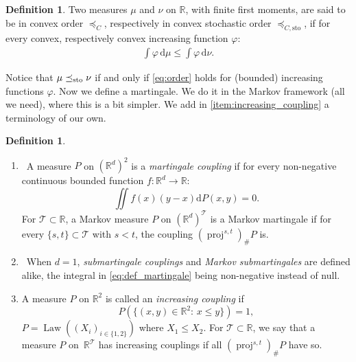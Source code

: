 \documentclass[JEP,XML,SOM,Unicode,NoEqCountersInSection,NoFloatCountersInSection,published]{cedram}
\theoremstyle{plain}
\theoremstyle{definition}
\newtheorem{defi}[them]{Definition}
\newcommand{\dd}{\mathrm{d}}
\newcommand{\Tt}{{\mathcal T}}
\newcommand{\R}{\mathbb{R}}
\newcommand{\law}{\operatorname{Law}}
\newcommand{\sto}{\mathrm{sto}}
\newcommand{\leqc}{\preceq_{C}}
\newcommand{\leqcs}{\preceq_{C,\sto}}
\newcommand{\leqs}{\preceq_{\text{\rm sto}}}
\newcommand{\pr}{\operatorname{proj}}
\begin{document}
\begin{defi}\label{defi:leqc}Two measures $\mu$ and $\nu$ on $\R$, with finite first moments, are said to be in convex order $\leqc$, respectively in convex stochastic order $\leqcs$, if for every convex, respectively convex increasing function $\varphi$:
\begin{align}\label{eq:order}
\int \varphi\, \dd \mu\leq \int \varphi\, \dd \nu.
\end{align}
\end{defi}

Notice that $\mu\leqs\nu$ if and only if \eqref{eq:order} holds for (bounded) increasing functions $\varphi$. Now we define a martingale. We do it in the Markov framework (all we need), where this is a bit simpler. We add in \eqref{item:increasing_coupling} a terminology of our own.

\skpt
\begin{defi}\label{defi:martingale}
\begin{enumerate}
\item
\label{item:martingale}\ A measure $P$ on $(\R^d)^2$ is a \emph{martingale coupling} if for every non-negative continuous bounded function $f:\R^d\to \R$:
\begin{equation}\label{eq:def_martingale}\iint f(x)(y-x) \dd P(x,y)=0.
\end{equation}
For $\Tt\subset\R$, a Markov measure $P$ on $(\R^d)^{\Tt}$ is a Markov martingale if for every $\{s,t\}\subset\Tt$ with $s<t$, the coupling $(\pr^{s,t})_\#P$ is.

\item\label{item:sousmartingale}\ When $d=1$, \emph{submartingale couplings} and \emph{Markov submartingales} are defined alike, the integral in \eqref{eq:def_martingale} being non-negative instead of null.

\item\label{item:increasing_coupling} A measure $P$ on $\R^2$ is called an \emph{increasing coupling} if
\[
P(\{(x,y)\in \R^2:\,x\leq y\})=1,
\]
\ie $P=\law((X_i)_{i\in\{1,2\}})$ where $X_1\leq X_2$. For $\Tt\subset\R$, we say that a measure $P$ on~$\R^\Tt$ has increasing couplings if all $(\pr^{s,t})_\#P$ have so.
\end{enumerate}
\end{defi}
\end{document}
